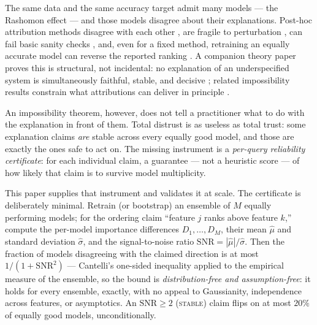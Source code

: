 \documentclass[10pt]{article}
\newcommand{\snr}{\mathrm{SNR}}
\newcommand{\stab}{\textsc{stable}}
\begin{document}
The same data and the same accuracy target admit many models --- the Rashomon effect
\citep{breiman2001statistical,fisher2019models,semenova2022existence,rudin2024amazing}
--- and those models disagree about their explanations. Post-hoc attribution methods
disagree with each other \citep{krishna2022disagreement}, are fragile to perturbation
\citep{ghorbani2019interpretation,slack2020fooling}, can fail basic sanity checks
\citep{adebayo2018sanity}, and, even for a fixed method, retraining an equally accurate
model can reverse the reported ranking \citep{caraker2026dash,caraker2026limits}. A
companion theory paper proves this is structural, not incidental: no explanation of an
underspecified system is simultaneously faithful, stable, and decisive
\citep{caraker2026limits}; related impossibility results constrain what attributions can
deliver in principle \citep{bilodeau2024impossibility,sundararajan2020many,kumar2020problems}.

An impossibility theorem, however, does not tell a practitioner what to do with the
explanation in front of them. Total distrust is as useless as total trust: some
explanation claims \emph{are} stable across every equally good model, and those are
exactly the ones safe to act on. The missing instrument is a \emph{per-query reliability
certificate}: for each individual claim, a guarantee --- not a heuristic score --- of how
likely that claim is to survive model multiplicity.

This paper supplies that instrument and validates it at scale. The certificate is
deliberately minimal. Retrain (or bootstrap) an ensemble of $M$ equally performing
models; for the ordering claim ``feature $j$ ranks above feature $k$,'' compute the
per-model importance differences $D_1,\dots,D_M$, their mean $\hat\mu$ and standard
deviation $\hat\sigma$, and the signal-to-noise ratio $\snr = |\hat\mu|/\hat\sigma$.
Then the fraction of models disagreeing with the claimed direction is at most
$1/(1+\snr^2)$ --- Cantelli's one-sided inequality applied to the empirical measure of
the ensemble, so the bound is \emph{distribution-free and assumption-free}: it holds for
every ensemble, exactly, with no appeal to Gaussianity, independence across features, or
asymptotics. An $\snr \ge 2$ (\stab{}) claim flips on at most $20\%$ of equally good
models, unconditionally.
\end{document}

